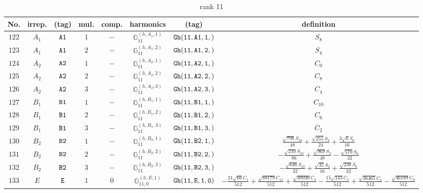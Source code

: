 \documentclass[fleqn,8pt]{jsarticle}
\begin{document}
\begin{table}[ht!]
\begin{center}
\caption{rank 11}
\renewcommand{\arraystretch}{1.3}
\begin{tabular}{cccccccc} \hline \hline
No. & irrep. & (tag) & mul. & comp. & harmonics & (tag) & definition \\ \hline
$ 122 $ & $ A_{1} $ & $ {\tt A1} $ & $ 1 $ & $ - $ & $ \mathbb{G}_{11}^{(h,A_{1},1)} $ & $ {\tt Gh(11,A1,1,)} $ & $ S_{8} $ \\
$ 123 $ & $ A_{1} $ & $ {\tt A1} $ & $ 2 $ & $ - $ & $ \mathbb{G}_{11}^{(h,A_{1},2)} $ & $ {\tt Gh(11,A1,2,)} $ & $ S_{4} $ \\
$ 124 $ & $ A_{2} $ & $ {\tt A2} $ & $ 1 $ & $ - $ & $ \mathbb{G}_{11}^{(h,A_{2},1)} $ & $ {\tt Gh(11,A2,1,)} $ & $ C_{0} $ \\
$ 125 $ & $ A_{2} $ & $ {\tt A2} $ & $ 2 $ & $ - $ & $ \mathbb{G}_{11}^{(h,A_{2},2)} $ & $ {\tt Gh(11,A2,2,)} $ & $ C_{8} $ \\
$ 126 $ & $ A_{2} $ & $ {\tt A2} $ & $ 3 $ & $ - $ & $ \mathbb{G}_{11}^{(h,A_{2},3)} $ & $ {\tt Gh(11,A2,3,)} $ & $ C_{4} $ \\
$ 127 $ & $ B_{1} $ & $ {\tt B1} $ & $ 1 $ & $ - $ & $ \mathbb{G}_{11}^{(h,B_{1},1)} $ & $ {\tt Gh(11,B1,1,)} $ & $ C_{10} $ \\
$ 128 $ & $ B_{1} $ & $ {\tt B1} $ & $ 2 $ & $ - $ & $ \mathbb{G}_{11}^{(h,B_{1},2)} $ & $ {\tt Gh(11,B1,2,)} $ & $ C_{6} $ \\
$ 129 $ & $ B_{1} $ & $ {\tt B1} $ & $ 3 $ & $ - $ & $ \mathbb{G}_{11}^{(h,B_{1},3)} $ & $ {\tt Gh(11,B1,3,)} $ & $ C_{2} $ \\
$ 130 $ & $ B_{2} $ & $ {\tt B2} $ & $ 1 $ & $ - $ & $ \mathbb{G}_{11}^{(h,B_{2},1)} $ & $ {\tt Gh(11,B2,1,)} $ & $ \frac{\sqrt{798} S_{10}}{48} + \frac{\sqrt{255} S_{2}}{24} + \frac{3 \sqrt{6} S_{6}}{16} $ \\
$ 131 $ & $ B_{2} $ & $ {\tt B2} $ & $ 2 $ & $ - $ & $ \mathbb{G}_{11}^{(h,B_{2},2)} $ & $ {\tt Gh(11,B2,2,)} $ & $ - \frac{\sqrt{210} S_{10}}{96} + \frac{\sqrt{969} S_{2}}{48} - \frac{\sqrt{570} S_{6}}{32} $ \\
$ 132 $ & $ B_{2} $ & $ {\tt B2} $ & $ 3 $ & $ - $ & $ \mathbb{G}_{11}^{(h,B_{2},3)} $ & $ {\tt Gh(11,B2,3,)} $ & $ - \frac{\sqrt{646} S_{10}}{32} + \frac{\sqrt{35} S_{2}}{16} + \frac{\sqrt{238} S_{6}}{32} $ \\
$ 133 $ & $ E $ & $ {\tt E} $ & $ 1 $ & $ 0 $ & $ \mathbb{G}_{11,0}^{(h,E,1)} $ & $ {\tt Gh(11,E,1,0)} $ & $ - \frac{21 \sqrt{66} C_{1}}{512} + \frac{\sqrt{88179} C_{11}}{512} + \frac{\sqrt{30030} C_{3}}{512} - \frac{15 \sqrt{143} C_{5}}{512} + \frac{\sqrt{36465} C_{7}}{512} - \frac{\sqrt{46189} C_{9}}{512} $ \\

\end{tabular}
\end{center}
\end{table}
\end{document}
